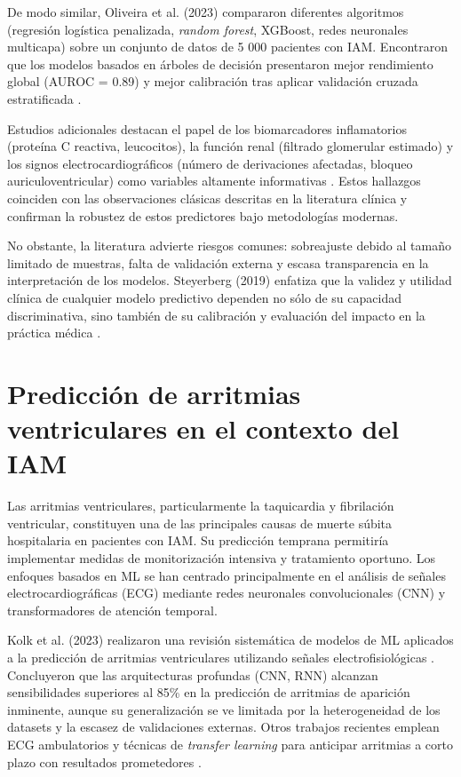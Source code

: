 \documentclass[12pt,a4paper]{article}
\begin{document}
De modo similar, Oliveira et al. (2023) compararon diferentes algoritmos (regresión logística penalizada, \textit{random forest}, XGBoost, redes neuronales multicapa) sobre un conjunto de datos de 5 000 pacientes con IAM. Encontraron que los modelos basados en árboles de decisión presentaron mejor rendimiento global (AUROC = 0.89) y mejor calibración tras aplicar validación cruzada estratificada \citep{oliveira2023ml}.

Estudios adicionales destacan el papel de los biomarcadores inflamatorios (proteína C reactiva, leucocitos), la función renal (filtrado glomerular estimado) y los signos electrocardiográficos (número de derivaciones afectadas, bloqueo auriculoventricular) como variables altamente informativas \citep{wang2022ami, santos2022tesis}. Estos hallazgos coinciden con las observaciones clásicas descritas en la literatura clínica y confirman la robustez de estos predictores bajo metodologías modernas.

No obstante, la literatura advierte riesgos comunes: sobreajuste debido al tamaño limitado de muestras, falta de validación externa y escasa transparencia en la interpretación de los modelos. Steyerberg (2019) enfatiza que la validez y utilidad clínica de cualquier modelo predictivo dependen no sólo de su capacidad discriminativa, sino también de su calibración y evaluación del impacto en la práctica médica \citep{steyerberg2019clinical}.

\section{Predicción de arritmias ventriculares en el contexto del IAM}
Las arritmias ventriculares, particularmente la taquicardia y fibrilación ventricular, constituyen una de las principales causas de muerte súbita hospitalaria en pacientes con IAM. Su predicción temprana permitiría implementar medidas de monitorización intensiva y tratamiento oportuno. Los enfoques basados en ML se han centrado principalmente en el análisis de señales electrocardiográficas (ECG) mediante redes neuronales convolucionales (CNN) y transformadores de atención temporal.

Kolk et al. (2023) realizaron una revisión sistemática de modelos de ML aplicados a la predicción de arritmias ventriculares utilizando señales electrofisiológicas \citep{kolk2023review}. Concluyeron que las arquitecturas profundas (CNN, RNN) alcanzan sensibilidades superiores al 85\% en la predicción de arritmias de aparición inminente, aunque su generalización se ve limitada por la heterogeneidad de los datasets y la escasez de validaciones externas. Otros trabajos recientes emplean ECG ambulatorios y técnicas de \textit{transfer learning} para anticipar arritmias a corto plazo con resultados prometedores \citep{liu2024ecg}.
\end{document}
